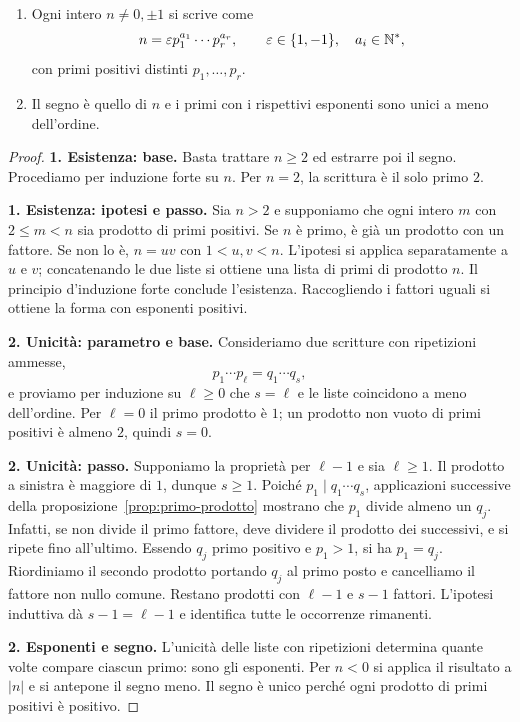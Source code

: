 \begin{teorema}\label{teo:fattorizzazione}
\begin{enumerate}[label=\arabic*.]
\item Ogni intero $n\ne0,\pm1$ si scrive come
\[
n=\varepsilon p_1^{a_1}\cdots p_r^{a_r},\qquad
\varepsilon\in\{1,-1\},\quad a_i\in\mathbb{N}^*,
\]
con primi positivi distinti $p_1,\ldots,p_r$.
\item Il segno è quello di $n$ e i primi con i rispettivi esponenti sono unici a meno dell'ordine.
\end{enumerate}
\end{teorema}
\begin{proof}
\textbf{1. Esistenza: base.} Basta trattare $n\ge2$ ed estrarre poi il segno. Procediamo per induzione forte su $n$. Per $n=2$, la scrittura è il solo primo $2$.

\textbf{1. Esistenza: ipotesi e passo.} Sia $n>2$ e supponiamo che ogni intero $m$ con $2\le m<n$ sia prodotto di primi positivi. Se $n$ è primo, è già un prodotto con un fattore. Se non lo è, $n=uv$ con $1<u,v<n$. L'ipotesi si applica separatamente a $u$ e $v$; concatenando le due liste si ottiene una lista di primi di prodotto $n$. Il principio d'induzione forte conclude l'esistenza. Raccogliendo i fattori uguali si ottiene la forma con esponenti positivi.

\textbf{2. Unicità: parametro e base.} Consideriamo due scritture con ripetizioni ammesse,
\[
p_1\cdots p_\ell=q_1\cdots q_s,
\]
e proviamo per induzione su $\ell\ge0$ che $s=\ell$ e le liste coincidono a meno dell'ordine. Per $\ell=0$ il primo prodotto è $1$; un prodotto non vuoto di primi positivi è almeno $2$, quindi $s=0$.

\textbf{2. Unicità: passo.} Supponiamo la proprietà per $\ell-1$ e sia $\ell\ge1$. Il prodotto a sinistra è maggiore di $1$, dunque $s\ge1$. Poiché $p_1\mid q_1\cdots q_s$, applicazioni successive della proposizione~\ref{prop:primo-prodotto} mostrano che $p_1$ divide almeno un $q_j$. Infatti, se non divide il primo fattore, deve dividere il prodotto dei successivi, e si ripete fino all'ultimo. Essendo $q_j$ primo positivo e $p_1>1$, si ha $p_1=q_j$. Riordiniamo il secondo prodotto portando $q_j$ al primo posto e cancelliamo il fattore non nullo comune. Restano prodotti con $\ell-1$ e $s-1$ fattori. L'ipotesi induttiva dà $s-1=\ell-1$ e identifica tutte le occorrenze rimanenti.

\textbf{2. Esponenti e segno.} L'unicità delle liste con ripetizioni determina quante volte compare ciascun primo: sono gli esponenti. Per $n<0$ si applica il risultato a $|n|$ e si antepone il segno meno. Il segno è unico perché ogni prodotto di primi positivi è positivo.
\end{proof}

